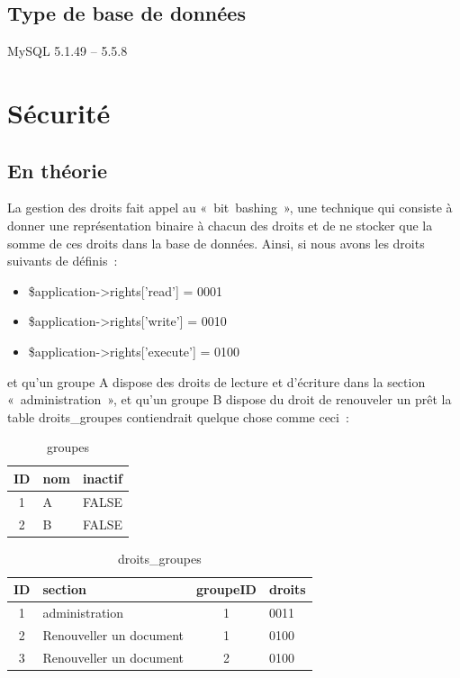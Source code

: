 \documentclass[letter, 11pt]{report}
\begin{document}
\subsection{Type de base de données}
MySQL 5.1.49 -- 5.5.8

\section{Sécurité}
\label{sec:sécurité}

\subsection{En théorie}

La gestion des droits fait appel au «~bit~bashing~», une technique qui consiste à donner une représentation binaire à chacun des droits et de ne stocker que la somme de ces droits dans la base de données. Ainsi, si nous avons les droits suivants de définis~:

\begin{itemize}
	\item \$application->rights['read'] = 0001
	\item \$application->rights['write'] = 0010
	\item \$application->rights['execute'] = 0100
\end{itemize}

et qu'un groupe A dispose des droits de lecture et d'écriture dans la section «~administration~», et qu'un groupe B dispose du droit de renouveler un prêt la table droits\_groupes contiendrait quelque chose comme ceci~:

\begin{table}[ht]
	\caption{groupes}
	\begin{center}
		\begin{tabular}{|c|l|l|}
			\hline
			ID & nom & inactif \\
			\hline
			1  & A   & FALSE \\
			2  & B   & FALSE \\
			\hline
		\end{tabular}
	\end{center}
\end{table}

\begin{table}[h!]
	\caption{droits\_groupes}
	\begin{center}
		\begin{tabular}{|c|l|c|l|}
			\hline
			ID & section                 & groupeID & droits \\
			\hline
			1  & administration          & 1        & 0011 \\
			2  & Renouveller un document & 1        & 0100 \\
			3  & Renouveller un document & 2        & 0100 \\
			\hline
		\end{tabular}
	\end{center}
\end{table}
\end{document}
